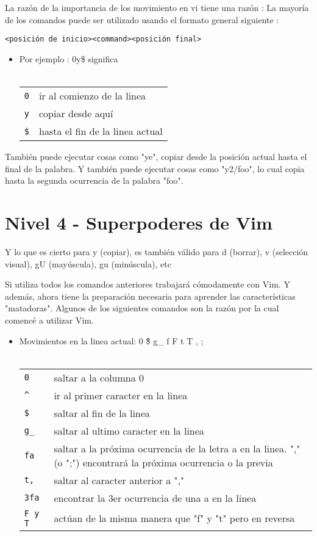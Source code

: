 La razón de la importancia de los movimiento en vi tiene una razón :
La mayoría de los comandos puede ser utilizado usando el formato general siguiente :

\texttt{<posición de inicio><command><posición final>}


\begin{itemize}
	\item Por ejemplo : 0y\$ significa \\ \\
\begin{tabular}{ l l }
	\texttt{0} & ir al comienzo de la linea \\
	\texttt{y} & copiar desde aquí \\
	\texttt{\$} & hasta el fin de la linea actual \\
\end{tabular}
\end{itemize}



También puede ejecutar cosas como "ye", copiar desde la posición actual hasta el final de la palabra.
Y también puede ejecutar cosas como "y2/foo", lo cual copia hasta la segunda ocurrencia de la palabra "foo".


\section{Nivel 4 - Superpoderes de Vim}

Y lo que es cierto para y (copiar), es también válido para d (borrar), v (selección visual), gU (mayúscula), gu (minúscula), etc


Si utiliza todos los comandos anteriores trabajará cómodamente con Vim.
Y además, ahora tiene la preparación necesaria para aprender las características "matadoras".
Algunos de los siguientes comandos son la razón por la cual comencé a utilizar Vim.



\begin{itemize}
	\item Movimientos en la linea actual:  0 \^ \$ g\_ f F t T , ; \\ \\
\begin{tabular}{ l l }
	\texttt{0} & saltar a la columna 0 \\
	\texttt{\^} & ir al primer caracter en la linea \\
	\texttt{\$} & saltar al fin de la linea \\
	\texttt{g\_} & saltar al ultimo caracter en la linea \\
	\texttt{fa} & saltar a la próxima ocurrencia de la letra a en la linea. "," (o ";") encontrará la próxima ocurrencia o la previa \\

	\texttt{t,} & saltar al caracter anterior a "," \\
	\texttt{3fa} & encontrar la 3er ocurrencia de una a en la linea \\
	\texttt{F y T} & actúan de la misma manera que "f" y "t" pero en reversa \\
\end{tabular}
\end{itemize}



